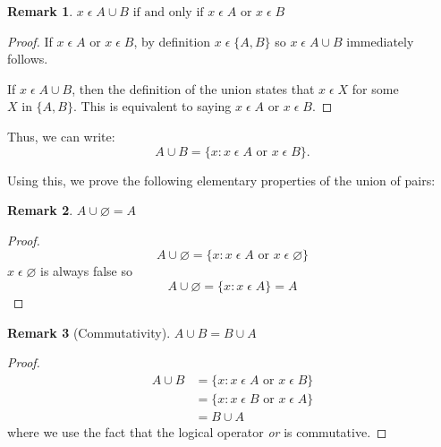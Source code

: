 \documentclass[12pt]{article}
\newtheorem{remark}{Remark}
\begin{document}
\begin{remark}
    $x\;\epsilon\;A \cup B \text{ if and only if } x\;\epsilon\;A \text{ or } x\;\epsilon\;B$
\end{remark}
\begin{proof}
    If $x\;\epsilon\;A \text{ or } x\;\epsilon\;B$, by definition $x\;\epsilon\;\{A, B\}$ so $x\;\epsilon\;A \cup B$
    immediately follows.

    If $x\;\epsilon\;A \cup B$, then the definition of the union states that $x\;\epsilon\;X$ for some
    $X \text{ in } \{A, B\}$. This is equivalent to saying $x\;\epsilon\;A \text{ or } x\;\epsilon\;B$.
\end{proof}

Thus, we can write:
\begin{equation}
    A \cup B = \{x: x\;\epsilon\;A \text{ or } x\;\epsilon\;B\}.
\end{equation}

Using this, we prove the following elementary properties of the union of pairs:
\begin{remark}
    $A \cup\varnothing = A$
\end{remark}
\begin{proof}
    \begin{displaymath}
        A \cup \varnothing = \{x: x\;\epsilon\;A \text{ or } x\;\epsilon\;\varnothing\}
    \end{displaymath}
    $x\;\epsilon\;\varnothing$ is always false so
    \begin{displaymath}
        A \cup \varnothing = \{x: x\;\epsilon\;A\} = A
    \end{displaymath}
\end{proof}

\begin{remark}[Commutativity]
    $A \cup B = B \cup A$
\end{remark}
\begin{proof}
    \begin{align*}
        A \cup B &= \{x: x\;\epsilon\;A \text{ or } x\;\epsilon\;B\}\\
                 &= \{x: x\;\epsilon\;B \text{ or } x\;\epsilon\;A\}\\
                 &= B \cup A
    \end{align*}
    where we use the fact that the logical operator \textit{or} is commutative.
\end{proof}
\end{document}
